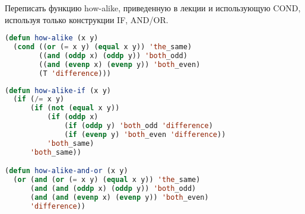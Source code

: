 Переписать функцию how-alike, приведенную в лекции и использующую COND,
используя только конструкции IF, AND/OR.

\begin{lstlisting}[language=Lisp]
(defun how-alike (x y)
  (cond ((or (= x y) (equal x y)) 'the_same)
        ((and (oddp x) (oddp y)) 'both_odd)
        ((and (evenp x) (evenp y)) 'both_even)
        (T 'difference)))
\end{lstlisting}

\begin{lstlisting}[language=Lisp]
(defun how-alike-if (x y)
  (if (/= x y)
      (if (not (equal x y))
          (if (oddp x)
              (if (oddp y) 'both_odd 'difference)
              (if (evenp y) 'both_even 'difference))
          'both_same)
      'both_same))

(defun how-alike-and-or (x y)
  (or (and (or (= x y) (equal x y)) 'the_same)
      (and (and (oddp x) (oddp y)) 'both_odd)
      (and (and (evenp x) (evenp y)) 'both_even)
      'difference))
\end{lstlisting}

